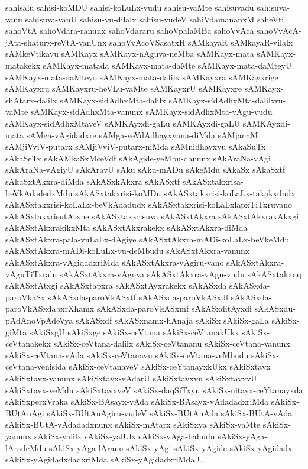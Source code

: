 {sahisalu
sahisi-koMDU
sahisi-koLuLx-vudu
sahisu-vaMte
sahisuvadu
sahisuva-vanu
sahisuva-vanU
sahisu-vu-dilalx
sahisu-vudeV
sahiVdamananxM
saheVti
sahoVtA
sahoVdara-ranunx
sahoVdararu
sahoVpalaMBa
sahoVvAca
sahoVvAcA-jAta-shaturx-reVtA-vanUnx
sahoVvAcoVSasatxH
sAMkayaR
sAMkayaR-vilalx
sAMkeVtikavu
sAMKayx
sAMKayx-nAguva-neMba
sAMKayx-mata
sAMKayx-matakekx
sAMKayx-matada
sAMKayx-mata-daMte
sAMKayx-mata-daMteyU
sAMKayx-mata-daMteyo
sAMKayx-mata-dalilx
sAMKayxra
sAMKayxrige
sAMKayxru
sAMKayxru-heVLu-vaMte
sAMKayxrU
sAMKayxre
sAMKayx-shAtarx-dalilx
sAMKayx-sidAdhxMta-dalilx
sAMKayx-sidAdhxMta-dalilxru-vaMte
sAMKayx-sidAdhxMta-vanunx
sAMKayx-sidAdhxMta-vAgu-vudu
sAMKayx-sidAdhxMtaveV
sAMKAyxdi-gaLu
sAMKAyxdi-gaLU
sAMKAyxdi-mata
sAMga-vAgidadxre
sAMga-veVdAdhayxyana-diMda
sAMjanaM
sAMjiVviV-putarx
sAMjiVviV-putarx-niMda
sAMnidhayxvu
sAkaSuTx
sAkaSeTx
sAkAMkaSxMceVdf
sAkAgide-yeMbu-danunx
sAkAraNa-vAgi
sAkAraNa-vAgiyU
sAkAravU
sAku
sAku-mADu
sAkeMdu
sAkaSx
sAkaSxtf
sAkaSxtAkxra-diMda
sAkASxkAkxra
sAkASxtf
sAkASxtakxrisa-beVkAdadedxMdu
sAkASxtakxrisi-koMDu
sAkASxtakxrisi-koLaLx-takakxdudx
sAkASxtakxrisi-koLaLx-beVkAdadudx
sAkASxtakxrisi-koLaLxlapxTiTxruvano
sAkASxtakxrisutAtxne
sAkASxtakxrisuva
sAkASxtAkxra
sAkASxtAkxrakAkxgi
sAkASxtAkxrakikxMta
sAkASxtAkxrakekx
sAkASxtAkxra-diMda
sAkASxtAkxra-pala-vuLaLx-dAgiye
sAkASxtAkxra-mADi-koLaLx-beVkeMdu
sAkASxtAkxra-mADi-koLuLx-vu-deMbudu
sAkASxtAkxra-vanunx
sAkASxtAkxra-vAgidadxriMda
sAkASxtAkxra-vAgiru-vano
sAkASxtAkxra-vAguTiTxralu
sAkASxtAkxra-vAguva
sAkASxtAkxra-vAgu-vudu
sAkASxtakxqq
sAkASxtAtxgi
sAkASxtapxra
sAkASxtAyxrakekx
sAkASxda
sAkASxda-paroVkaSx
sAkASxda-paroVkASxtf
sAkASxda-paroVkASxdf
sAkASxda-paroVkASxdabxrXhamx
sAkASxda-paroVkASxmf
sAkASxditAyxdi
sAkASxdu-pAdAnoVpAdeVya
sAkASxdf
sAkASxnamx-hAnaja
sAkiSx
sAkiSx-gaLa
sAkiSx-giMta
sAkiSxgU
sAkiSxge
sAkiSx-ceVtana
sAkiSx-ceVtanakUkx
sAkiSx-ceVtanakekx
sAkiSx-ceVtana-dalilx
sAkiSx-ceVtananu
sAkiSx-ceVtana-vanunx
sAkiSx-ceVtana-vAda
sAkiSx-ceVtanavu
sAkiSx-ceVtana-veMbudu
sAkiSx-ceVtana-venisida
sAkiSx-ceVtanaveV
sAkiSx-ceYtanayxkUkx
sAkiSxtavx
sAkiSxtavx-vanunx
sAkiSxtavx-vAdarU
sAkiSxtavxvu
sAkiSxtavxvU
sAkiSxtavx-veMdu
sAkiSxtavxveV
sAkiSx-daqSiTxyu
sAkiSx-nitayx-ceYtanayxda
sAkiSxperxVraka
sAkiSx-BAsayx-vAda
sAkiSx-BAsayx-vAdadadxriMda
sAkiSx-BUtAnAgi
sAkiSx-BUtAnAgiru-vudeV
sAkiSx-BUtAnAda
sAkiSx-BUtA-vAda
sAkiSx-BUtA-vAdadadxnunx
sAkiSx-mAtarx
sAkiSxya
sAkiSx-yaMte
sAkiSx-yanunx
sAkiSx-yalilx
sAkiSx-yalUlx
sAkiSx-yAga-bahudu
sAkiSx-yAga-lAradeMdu
sAkiSx-yAga-lAranu
sAkiSx-yAgi
sAkiSx-yAgide
sAkiSx-yAgidadx
sAkiSx-yAgidadxdadxriMda
sAkiSx-yAgidadxriMdalU
}
